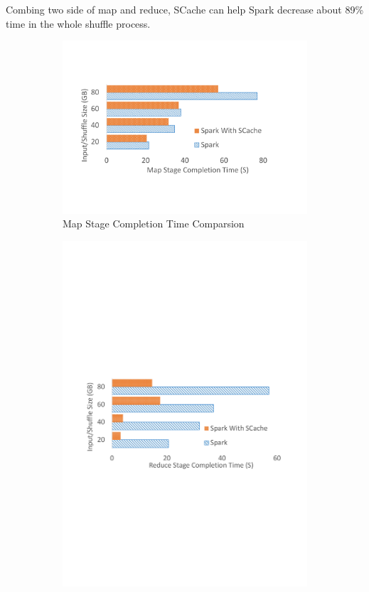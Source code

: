 Combing two side of map and reduce, SCache can help Spark decrease about 89\% time in the whole shuffle process.

\begin{figure}
\begin{subfigure}{\linewidth}
	\includegraphics[width=\linewidth]{fig/groupbymapstage}
	\caption{Map Stage Completion Time Comparsion}
	\label{fig:mapstage}
\end{subfigure}
\begin{subfigure}{\linewidth}
	\includegraphics[width=\linewidth]{fig/groupbyreducestage}

\end{subfigure}
\end{figure}
